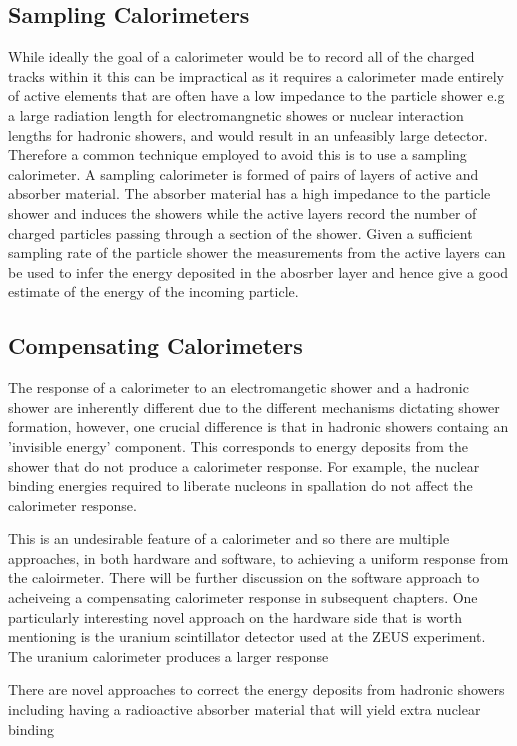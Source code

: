 \subsection{Sampling Calorimeters}
While ideally the goal of a calorimeter would be to record all of the charged tracks within it this can be impractical as it requires a calorimeter made entirely of active elements that are often have a low impedance to the particle shower e.g a large radiation length for electromangnetic showes or nuclear interaction lengths for hadronic showers, and would result in an unfeasibly large detector.  Therefore a common technique employed to avoid this is to use a sampling calorimeter.  A sampling calorimeter is formed of pairs of layers of active and absorber material.  The absorber material has a high impedance to the particle shower and induces the showers while the active layers record the number of charged particles passing through a section of the shower.  Given a sufficient sampling rate of the particle shower the measurements from the active layers can be used to infer the energy deposited in the abosrber layer and hence give a good estimate of the energy of the incoming particle.  

\subsection{Compensating Calorimeters}
The response of a calorimeter to an electromangetic shower and a hadronic shower are inherently different due to the different mechanisms dictating shower formation, however, one crucial difference is that in hadronic showers containg an 'invisible energy' component.  This corresponds to energy deposits from the shower that do not produce a calorimeter response.  For example, the nuclear binding energies required to liberate nucleons in spallation do not affect the calorimeter response.  

This is an undesirable feature of a calorimeter and so there are multiple approaches, in both hardware and software, to achieving a uniform response from the caloirmeter.  There will be further discussion on the software approach to acheiveing a compensating calorimeter response in subsequent chapters.  One particularly interesting novel approach on the hardware side that is worth mentioning is the uranium scintillator detector used at the ZEUS experiment.  The uranium calorimeter produces a larger response 

There are novel approaches to correct the energy deposits from hadronic showers including having a radioactive absorber material that will yield extra nuclear binding


